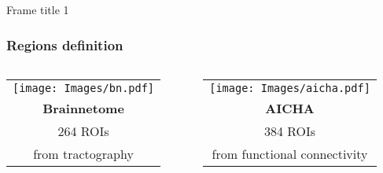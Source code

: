 \documentclass{beamer}
\newcommand{\myred}[1]{{\textbf{#1}}}
\begin{document}
\begin{frame}{Frame title 1}
\frametitle{Regions definition}
  \begin{center} 
    \begin{columns}

      \begin{column}{0.35\textwidth}
        \begin{tabular}{c} 
	   \texttt{[image: Images/bn.pdf]}\\
		\myred{Brainnetome}\\ 264 ROIs\\ from tractography
        \end{tabular}   
      \end{column}

      \begin{column}{0.35\textwidth}
        \begin{tabular}{c} 
		\texttt{[image: Images/aicha.pdf]}\\
		\myred{AICHA}\\ 384 ROIs \\from functional connectivity
		\end{tabular}   
      \end{column}

     \end{columns}
   \end{center}
 \end{frame}
\end{document}
